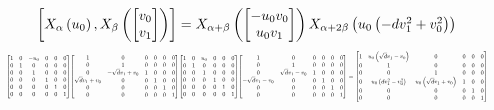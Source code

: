 \documentclass[11pt]{article}
\theoremstyle{definition}
\begin{document}
\[
\scaletoalign{\textwidth}{\left[ X_{\alpha}\left(u_{0}\right), X_{\beta}\left(\left[\begin{matrix}v_{0}\\v_{1}\end{matrix}\right]\right) \right] = X_{\alpha + \beta}\left(\left[\begin{matrix}- u_{0} v_{0}\\u_{0} v_{1}\end{matrix}\right]\right) X_{\alpha + 2\beta}\left(u_{0} \left(- d v_{1}^{2} + v_{0}^{2}\right)\right)}
\]
\[
\scaletoalign{\textwidth}{{\left[\begin{matrix}1 & 0 & - u_{0} & 0 & 0 & 0\\0 & 1 & 0 & 0 & 0 & 0\\0 & 0 & 1 & 0 & 0 & 0\\0 & 0 & 0 & 1 & 0 & 0\\0 & 0 & 0 & 0 & 1 & 0\\0 & 0 & 0 & 0 & 0 & 1\end{matrix}\right]} {\left[\begin{matrix}1 & 0 & 0 & 0 & 0 & 0\\0 & 1 & 0 & 0 & 0 & 0\\0 & - \sqrt{d} v_{1} + v_{0} & 1 & 0 & 0 & 0\\\sqrt{d} v_{1} + v_{0} & 0 & 0 & 1 & 0 & 0\\0 & 0 & 0 & 0 & 1 & 0\\0 & 0 & 0 & 0 & 0 & 1\end{matrix}\right]} {\left[\begin{matrix}1 & 0 & u_{0} & 0 & 0 & 0\\0 & 1 & 0 & 0 & 0 & 0\\0 & 0 & 1 & 0 & 0 & 0\\0 & 0 & 0 & 1 & 0 & 0\\0 & 0 & 0 & 0 & 1 & 0\\0 & 0 & 0 & 0 & 0 & 1\end{matrix}\right]} {\left[\begin{matrix}1 & 0 & 0 & 0 & 0 & 0\\0 & 1 & 0 & 0 & 0 & 0\\0 & \sqrt{d} v_{1} - v_{0} & 1 & 0 & 0 & 0\\- \sqrt{d} v_{1} - v_{0} & 0 & 0 & 1 & 0 & 0\\0 & 0 & 0 & 0 & 1 & 0\\0 & 0 & 0 & 0 & 0 & 1\end{matrix}\right]} = {\left[\begin{matrix}1 & u_{0} \left(\sqrt{d} v_{1} - v_{0}\right) & 0 & 0 & 0 & 0\\0 & 1 & 0 & 0 & 0 & 0\\0 & 0 & 1 & 0 & 0 & 0\\0 & u_{0} \left(d v_{1}^{2} - v_{0}^{2}\right) & u_{0} \left(\sqrt{d} v_{1} + v_{0}\right) & 1 & 0 & 0\\0 & 0 & 0 & 0 & 1 & 0\\0 & 0 & 0 & 0 & 0 & 1\end{matrix}\right]}}
\]
\end{document}
